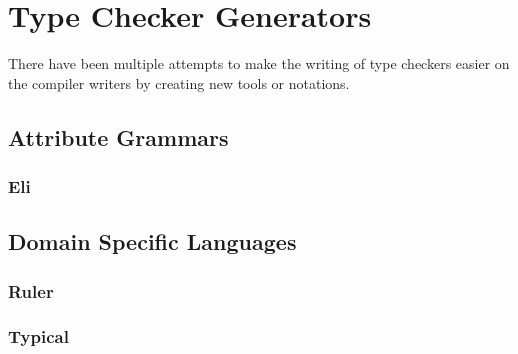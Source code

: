 \section{Type Checker Generators}
There have been multiple attempts to make the writing of type checkers easier on the compiler writers by creating new tools or notations.

\subsection{Attribute Grammars}
\subsubsection{Eli}

\subsection{Domain Specific Languages}
\subsubsection{Ruler}
\subsubsection{Typical}
